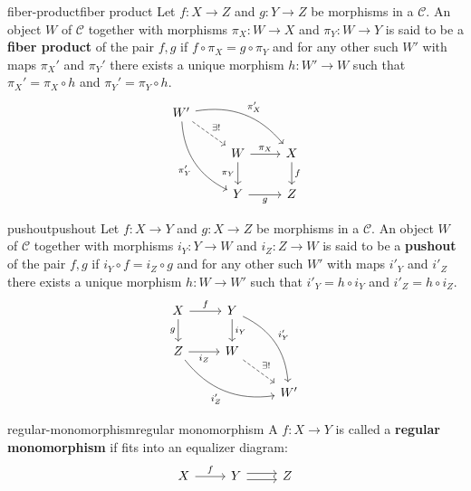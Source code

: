 \begin{topic}{fiber-product}{fiber product}
    Let $f : X \to Z$ and $g : Y \to Z$ be morphisms in a  $\mathcal{C}$. An object $W$ of $\mathcal{C}$ together with morphisms $\pi_X: W \to X$ and $\pi_Y : W \to Y$ is said to be a \textbf{fiber product} of the pair $f, g$ if $f \circ \pi_X = g \circ \pi_Y$ and for any other such $W'$ with maps $\pi_X'$ and $\pi_Y'$ there exists a unique morphism $h : W' \to W$ such that $\pi_X' = \pi_X \circ h$ and $\pi_Y' = \pi_Y \circ h$.
    \[ \begin{tikzcd} W' \arrow[bend left=30]{rrd}{\pi_X'} \arrow[swap, bend right=30]{ddr}{\pi_Y'} \arrow[dashed]{rd}{\exists!} & & \\ & W \arrow{r}{\pi_X} \arrow[swap]{d}{\pi_Y} & X \arrow{d}{f} \\ & Y \arrow[swap]{r}{g} & Z \end{tikzcd} \]
\end{topic}

\begin{topic}{pushout}{pushout}
    Let $f : X \to Y$ and $g : X \to Z$ be morphisms in a  $\mathcal{C}$. An object $W$ of $\mathcal{C}$ together with morphisms $i_Y: Y \to W$ and $i_Z : Z \to W$ is said to be a \textbf{pushout} of the pair $f, g$ if $i_Y \circ f = i_Z \circ g$ and for any other such $W'$ with maps $i'_Y$ and $i'_Z$ there exists a unique morphism $h : W \to W'$ such that $i'_Y = h \circ i_Y$ and $i'_Z = h \circ i_Z$.
    \[ \begin{tikzcd} X \arrow{r}{f} \arrow[swap]{d}{g} & Y \arrow{d}{i_Y} \arrow[bend left=30]{rdd}{i'_Y} & \\ Z \arrow[swap]{r}{i_Z} \arrow[swap, bend right=30]{drr}{i'_Z} & W \arrow[dashed]{rd}{\exists!} & \\ & & W' \end{tikzcd} \]
\end{topic}

\begin{topic}{regular-monomorphism}{regular monomorphism}
    A  $f : X \to Y$ is called a \textbf{regular monomorphism} if fits into an equalizer diagram:
    \[ \begin{tikzcd} X \arrow{r}{f} & Y \arrow[shift left=0.25em]{r} \arrow[shift right=0.25em]{r} & Z \end{tikzcd} \]
\end{topic}

